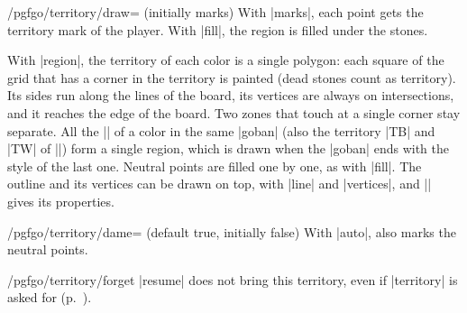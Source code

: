 	\begin{key}{/pgfgo/territory/draw= (initially marks)}
		With |marks|, each point gets the territory mark of the player. With |fill|, the region is filled under the stones.

		\begin{codeexample}[width=4.75cm]
			\begin{goban}[label = {at = {above, left}}]

			\end{goban}
		\end{codeexample}

		With |region|, the territory of each color is a single polygon: each square of the grid that has a corner in the territory is painted (dead stones count as territory). Its sides run along the lines of the board, its vertices are always on intersections, and it reaches the edge of the board. Two zones that touch at a single corner stay separate. All the |\territory| of a color in the same |goban| (also the territory |TB| and |TW| of |\sgf|) form a single region, which is drawn when the |goban| ends with the style of the last one. Neutral points are filled one by one, as with |fill|. The outline and its vertices can be drawn on top, with |line| and |vertices|, and |\pgfgoregion| gives its properties.

		\begin{codeexample}[width=4.75cm]
			\begin{goban}[label = {at = {above, left}}]

			\end{goban}
		\end{codeexample}
	\end{key}

	\begin{key}{/pgfgo/territory/dame= (default true, initially false)}
		With |auto|, also marks the neutral points.
	\end{key}

	\begin{key}{/pgfgo/territory/forget}
		|resume| does not bring this territory, even if |territory| is asked for (p.~\pageref{subsec:recordar}).
	\end{key}

